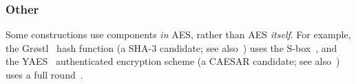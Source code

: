 
\subsubsection{Other}

Some constructions use components {\em in} AES, rather than AES {\em itself}.
For example,
the Gr{\o}stl~\cite{GKMMRST:11} hash function
(a SHA-3  candidate; see also~\cite{BBGR:09})
uses the S-box~\cite[Section 4.3]{GKMMRST:11},
and
the YAES~\cite{BosVer:14} authenticated encryption scheme
(a CAESAR candidate; see also~\cite[Section 4.1]{AnkAnk:16})
uses a full round~\cite[Section 1.3]{BosVer:14}.

